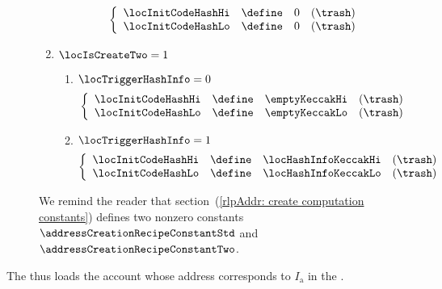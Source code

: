 \begin{description}
\begin{enumerate}
				\[
					\left\{ \begin{array}{lclr}
						\locInitCodeHashHi & \define & 0 & (\trash) \\
						\locInitCodeHashLo & \define & 0 & (\trash) \\
					\end{array} \right.
				\]
		        \item \If $\locIsCreateTwo = 1$ \Then 
				\begin{enumerate}
				        \item \If $\locTriggerHashInfo = 0$
						\[
							\left\{ \begin{array}{lclr}
								\locInitCodeHashHi & \define & \emptyKeccakHi & (\trash) \\
								\locInitCodeHashLo & \define & \emptyKeccakLo & (\trash) \\
							\end{array} \right.
						\]
				        \item \If $\locTriggerHashInfo = 1$
						\[
							\left\{ \begin{array}{lclr}
								\locInitCodeHashHi & \define & \locHashInfoKeccakHi & (\trash) \\
								\locInitCodeHashLo & \define & \locHashInfoKeccakLo & (\trash) \\
							\end{array} \right.
						\]
				\end{enumerate}
		\end{enumerate}
		\saNote{} We remind the reader that section~(\ref{rlpAddr: create computation constants}) defines two nonzero constants $\addressCreationRecipeConstantStd$ and $\addressCreationRecipeConstantTwo$.
\end{description}
\saNote{} The \zkEvm{} thus loads the account whose address corresponds to $I_\text{a}$ in the \cite{EYP}.
